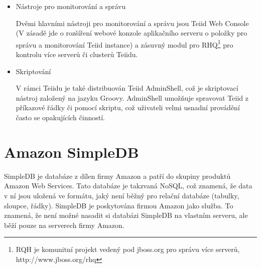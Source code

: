 \documentclass[oneside,11pt]{fithesis2}
\begin{document}
\begin{itemize}
\begin{itemize}
  \item Nástroje pro monitorování a správu
  
  Dvěmi hlavními nástroji pro monitorování a správu jsou Teiid Web Console (V zásadě jde o rozšíření webové konzole aplikačního serveru o položky pro správu a monitorování Teiid instance) a zásuvný modul pro RHQ\footnote{RQH je komunitní projekt vedený pod jboss.org pro správu více serverů, http://www.jboss.org/rhq} pro kontrolu více serverů či clusterů Teiidu.
  
  \item Skriptování
  
  V rámci Teiidu je také distribuován Teiid AdminShell, což je skriptovací nástroj založený na jazyku Groovy. AdminShell umožňuje spravovat Teiid z příkazové řádky či pomocí skriptu, což uživateli velmi usnadní provádění často se opakujících činností.
  
  \end{itemize}

\end{itemize}

\chapter{Amazon SimpleDB}
SimpleDB je databáze z dílen firmy Amazon a patří do skupiny produktů Amazon Web Services. Tato databáze je takzvaná NoSQL, což znamená, že data v ní jsou uložená ve formátu, jaký není běžný pro relační databáze (tabulky, sloupce, řádky). SimpleDB je poskytována firmou Amazon jako služba. To znamená, že není možné nasadit si databázi SimpleDB na vlastním serveru, ale běží pouze na serverech firmy Amazon. 
\end{document}
